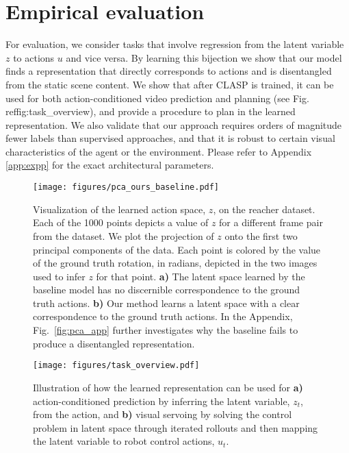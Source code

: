 \documentclass{article} %
\begin{document}
\vspace{-3pt}\section{Empirical evaluation}\vspace{-4pt}

For evaluation, we consider tasks that involve regression from the latent variable $z$ to actions $u$ and vice versa. By learning this bijection we show that our model finds a representation that directly corresponds to actions and is disentangled from the static scene content. We show that after CLASP is trained, it can be used for both action-conditioned video prediction and planning (see Fig.\\ref{fig:task_overview}), and provide a procedure to plan in the learned representation. We also validate that our approach requires orders of magnitude fewer labels than supervised approaches, and that it is robust to certain visual characteristics of the agent or the environment.  Please refer to Appendix \ref{app:expp} for the exact architectural parameters.

\begin{figure}[t]
  \centering
  \texttt{[image: figures/pca\_ours\_baseline.pdf]}
  \vspace{-10pt}
  \caption{Visualization of the learned action space, $z$, on the reacher dataset. Each of the 1000 points depicts a value of $z$ for a different frame pair from the dataset. We plot the projection of $z$ onto the first two principal components of the data. Each point is colored by the value of the ground truth rotation, in radians, depicted in the two images used to infer $z$ for that point. \textbf{a)} The latent space learned by the baseline model has no discernible correspondence to the ground truth actions. \textbf{b)} Our method learns a latent space with a clear correspondence to the ground truth actions. In the Appendix,
  Fig.\ \ref{fig:pca_app} further investigates why the baseline fails to produce a disentangled representation. 
  }
  \label{fig:pca}
  \vspace{-8pt}
\end{figure}

\begin{wrapfigure}{R}{0.6\textwidth}
  \vspace{-15pt}
  \texttt{[image: figures/task\_overview.pdf]}\vspace{-10pt}
  \caption{Illustration of how the learned representation can be used for \textbf{a)} action-conditioned prediction by inferring the latent variable, $z_t$, from the action, and \textbf{b)} visual servoing by solving the control problem in latent space through iterated rollouts and then mapping the latent variable to robot control actions, $u_t$.}
  \vspace{-15pt}
  \label{fig:task_overview}
\end{wrapfigure}
\end{document}
